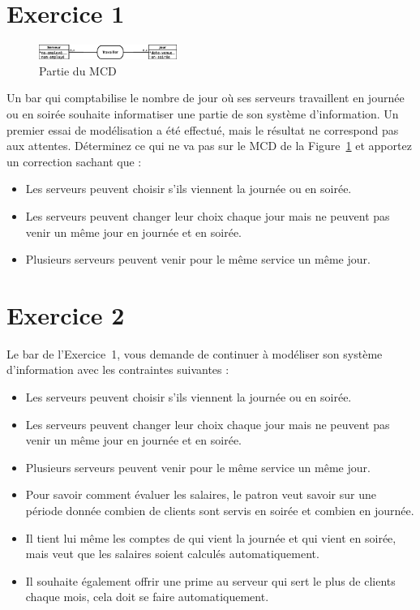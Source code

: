\section*{Exercice 1}
\begin{figure}
    \begin{center}
    \includegraphics[width=0.4\textwidth]{partie_mcd.eps} 
    \caption{\label{mcd} Partie du MCD}
    \end{center}
\end{figure}
Un bar qui comptabilise le nombre de jour où ses serveurs travaillent en journée ou en soirée souhaite informatiser une partie de son système d'information. Un premier essai de modélisation a été effectué, mais le résultat ne correspond pas aux attentes. Déterminez ce qui ne va pas sur le MCD de la Figure~\ref{mcd} et apportez un correction sachant que : \\
\begin{itemize}
    \item Les serveurs peuvent choisir s'ils viennent la journée ou en soirée.
    \item Les serveurs peuvent changer leur choix chaque jour mais ne peuvent pas venir un même jour en journée et en soirée.
    \item Plusieurs serveurs peuvent venir pour le même service un même jour.
\end{itemize}

\section*{Exercice 2}
Le bar de l'Exercice~1, vous demande de continuer à modéliser son système d'information avec les contraintes suivantes : 
\begin{itemize}
    \item Les serveurs peuvent choisir s'ils viennent la journée ou en soirée.
    \item Les serveurs peuvent changer leur choix chaque jour mais ne peuvent pas venir un même jour en journée et en soirée.
    \item Plusieurs serveurs peuvent venir pour le même service un même jour.
    \item Pour savoir comment évaluer les salaires, le patron veut savoir sur une période donnée combien de clients sont servis en soirée et combien en journée.
    \item Il tient lui même les comptes de qui vient la journée et qui vient en soirée, mais veut que les salaires soient calculés automatiquement.
    \item Il souhaite également offrir une prime au serveur qui sert le plus de clients chaque mois, cela doit se faire automatiquement.
\end{itemize}

